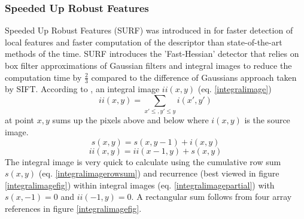 \documentclass[english,12pt,a4paper,pdftex,elec,utf8, table]{aaltothesis}
\begin{document}
\subsubsection{Speeded Up Robust Features}
Speeded Up Robust Features (SURF) was introduced in \cite{Bay2006} for faster detection of local features and faster computation of the descriptor than state-of-the-art methods of the time. SURF introduces the 'Fast-Hessian' detector that relies on box filter approximations of Gaussian filters and integral images to reduce the computation time by $\frac{2}{3}$ compared to the difference of Gaussians approach taken by SIFT. According to \cite{Viola2001}, an integral image $ii(x,y)$ (eq. \ref{integralimage})
\begin{equation}
  \label{integralimage}
ii(x,y) = \sum\limits_{x'\le,y'\le y} i(x', y')
\end{equation}
at point $x, y$ sums up the pixels above and below where $i(x,y)$ is the source image.
\begin{equation}
  \label{integralimagerowsum}
s(x,y) = s(x, y - 1) + i(x,y)
\end{equation}
\begin{equation}
  \label{integralimagepartial}
  ii(x,y) = ii(x-1,y) + s(x,y)
\end{equation}
The integral image is very quick to calculate using the cumulative row sum $s(x,y)$ (eq. \ref{integralimagerowsum}) and recurrence (best viewed in figure \ref{integralimagefig}) within integral images (eq. \ref{integralimagepartial}) with $s(x, -1) = 0$ and $ii(-1,y)=0$. A rectangular sum follows from four array references in figure \ref{integralimagefig}.
\end{document}
